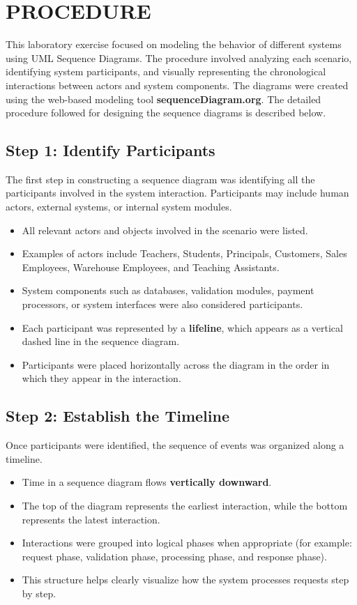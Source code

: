 \chapter{PROCEDURE}
\label{ch:procedure}

This laboratory exercise focused on modeling the behavior of different systems using UML Sequence Diagrams. The procedure involved analyzing each scenario, identifying system participants, and visually representing the chronological interactions between actors and system components. The diagrams were created using the web-based modeling tool \textbf{sequenceDiagram.org}. The detailed procedure followed for designing the sequence diagrams is described below.

\section{Step 1: Identify Participants}
The first step in constructing a sequence diagram was identifying all the participants involved in the system interaction. Participants may include human actors, external systems, or internal system modules.

\begin{itemize}
    \item All relevant actors and objects involved in the scenario were listed.
    \item Examples of actors include Teachers, Students, Principals, Customers, Sales Employees, Warehouse Employees, and Teaching Assistants.
    \item System components such as databases, validation modules, payment processors, or system interfaces were also considered participants.
    \item Each participant was represented by a \textbf{lifeline}, which appears as a vertical dashed line in the sequence diagram.
    \item Participants were placed horizontally across the diagram in the order in which they appear in the interaction.
\end{itemize}

\section{Step 2: Establish the Timeline}
Once participants were identified, the sequence of events was organized along a timeline.

\begin{itemize}
    \item Time in a sequence diagram flows \textbf{vertically downward}.
    \item The top of the diagram represents the earliest interaction, while the bottom represents the latest interaction.
    \item Interactions were grouped into logical phases when appropriate (for example: request phase, validation phase, processing phase, and response phase).
    \item This structure helps clearly visualize how the system processes requests step by step.
\end{itemize}

